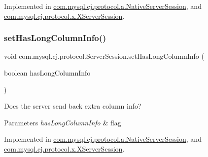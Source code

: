 Implemented in \mbox{\hyperlink{classcom_1_1mysql_1_1cj_1_1protocol_1_1a_1_1_native_server_session_a394485ebd068b7fa0c9a0c7343fcd53c}{com.\+mysql.\+cj.\+protocol.\+a.\+Native\+Server\+Session}}, and \mbox{\hyperlink{classcom_1_1mysql_1_1cj_1_1protocol_1_1x_1_1_x_server_session_a8dbd15cc8a7b909c36ca095b96a06fed}{com.\+mysql.\+cj.\+protocol.\+x.\+X\+Server\+Session}}.

\mbox{\label{interfacecom_1_1mysql_1_1cj_1_1protocol_1_1_server_session_a004d9939fa7471ce08e0b404363642fc}} 
\subsubsection{\texorpdfstring{set\+Has\+Long\+Column\+Info()}{setHasLongColumnInfo()}}
{\footnotesize\ttfamily void com.\+mysql.\+cj.\+protocol.\+Server\+Session.\+set\+Has\+Long\+Column\+Info (\begin{DoxyParamCaption}\item[{boolean}]{has\+Long\+Column\+Info }\end{DoxyParamCaption})}

Does the server send back extra column info?


\begin{DoxyParams}{Parameters}
{\em has\+Long\+Column\+Info} & flag \\
\hline
\end{DoxyParams}


Implemented in \mbox{\hyperlink{classcom_1_1mysql_1_1cj_1_1protocol_1_1a_1_1_native_server_session_ab7e6639fd06a4d47ab35e3cd89dfc10a}{com.\+mysql.\+cj.\+protocol.\+a.\+Native\+Server\+Session}}, and \mbox{\hyperlink{classcom_1_1mysql_1_1cj_1_1protocol_1_1x_1_1_x_server_session_a3a9514d67c9914f156534c2a3e53b35a}{com.\+mysql.\+cj.\+protocol.\+x.\+X\+Server\+Session}}.

\mbox{\label{interfacecom_1_1mysql_1_1cj_1_1protocol_1_1_server_session_a9472dd2bebc57f2dc9f94bae07ac6e9e}} 
